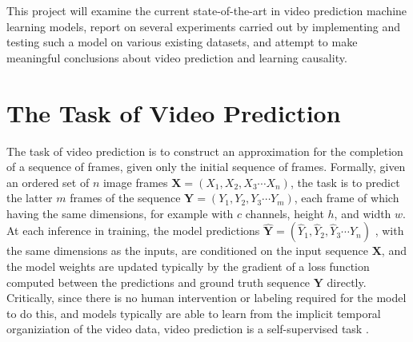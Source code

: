 \documentclass{scrartcl}
\begin{document}
This project will examine the current state-of-the-art in video prediction
machine learning models, report on several experiments carried out by
implementing and testing such a model on various existing datasets, and attempt
to make meaningful conclusions about video prediction and learning causality.

\section{The Task of Video Prediction}
\label{sec:task}

\newcommand{\Xseq}{$\boldsymbol{X} = \left( X_1 , X_2 , X_3 \cdots X_n \right)$}
\newcommand{\Yseq}{$\boldsymbol{Y} = \left( Y_1 , Y_2 , Y_3 \cdots Y_m \right)$}
\newcommand{\Yhatseq}{
	$\hat{\boldsymbol{Y}} = 
	\left( \hat{Y}_1 , \hat{Y}_2 , \hat{Y}_3 \cdots \hat{Y}_n \right)$
}

The task of video prediction is to construct an approximation for the
completion of a sequence of frames, given only the initial sequence of frames.
Formally, given an ordered set of $n$ image frames \Xseq, the task is to
predict the latter $m$ frames of the sequence \Yseq, each frame of which having
the same dimensions, for example with $c$ channels, height $h$, and width $w$.
At each inference in training, the model predictions \Yhatseq, with the same
dimensions as the inputs, are conditioned on the input sequence
$\boldsymbol{X}$, and the model weights are updated typically by the gradient
of a loss function computed between the predictions and ground truth sequence
$\boldsymbol{Y}$ directly. Critically, since there is no human intervention or
labeling required for the model to do this, and models typically are able to
learn from the implicit temporal organiziation of the video data, video
prediction is a self-supervised task \cite{video_prediction_survey}.


\newpage
\end{document}
